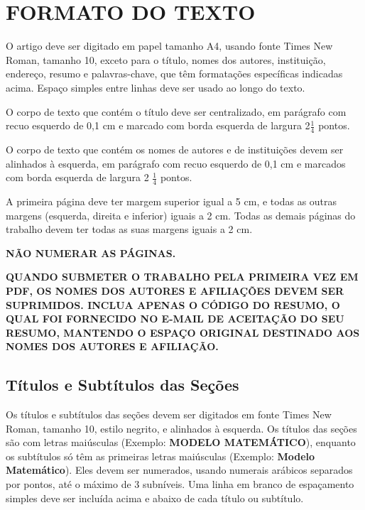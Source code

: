 \documentclass[10pt,fleqn,a4paper]{article}
\begin{document}
    \section{FORMATO DO TEXTO}
    
        
        O artigo deve ser digitado em papel tamanho A4, usando fonte Times New Roman, tamanho 10, exceto para o título, nomes dos autores, instituição, endereço, resumo e palavras-chave, que têm formatações específicas indicadas acima. Espaço simples entre linhas deve ser usado ao longo do texto.

        O corpo de texto que contém o título deve ser centralizado, em parágrafo com recuo esquerdo de 0,1 cm e marcado com borda esquerda de largura 2$\frac{1}{4}$ pontos.

        O corpo de texto que contém os nomes de autores e de instituições devem ser alinhados à esquerda, em parágrafo com recuo esquerdo de 0,1 cm e marcados com borda esquerda de largura 2 $\frac{1}{4}$ pontos.

        A primeira página deve ter margem superior igual a 5 cm, e todas as outras margens (esquerda, direita e inferior) iguais a 2 cm. Todas as demais páginas do trabalho devem ter todas as suas margens iguais a 2 cm.

        \textbf{\textcolor[rgb]{0.98,0.00,0.00}{NÃO NUMERAR AS PÁGINAS.}}

        \textbf{\textcolor[rgb]{1.00,0.00,0.00}{QUANDO SUBMETER O TRABALHO PELA PRIMEIRA VEZ EM PDF, OS NOMES DOS AUTORES E AFILIAÇÕES DEVEM SER SUPRIMIDOS. INCLUA APENAS O CÓDIGO DO RESUMO, O QUAL FOI FORNECIDO NO E-MAIL DE ACEITAÇÃO DO SEU RESUMO, MANTENDO O ESPAÇO ORIGINAL DESTINADO AOS NOMES DOS AUTORES E AFILIAÇÃO.}}


    \subsection{Títulos e Subtítulos das Seções }

        Os títulos e subtítulos das seções devem ser digitados em fonte Times New Roman, tamanho 10, estilo negrito, e alinhados à esquerda. Os títulos das seções são com letras maiúsculas (Exemplo: \textbf{MODELO MATEMÁTICO}), enquanto os subtítulos só têm as primeiras letras maiúsculas (Exemplo: \textbf{Modelo Matemático}). Eles devem ser numerados, usando numerais arábicos separados por pontos, até o máximo de 3 subníveis. Uma linha em branco de espaçamento simples deve ser incluída acima e abaixo de cada título ou subtítulo.
\end{document}
